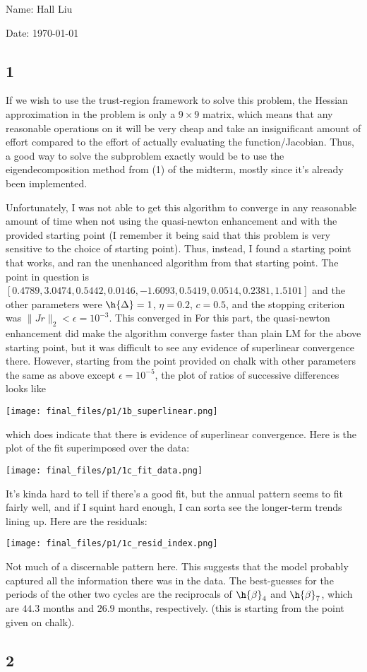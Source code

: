 \documentclass{article}
\newcommand{\ep}{\epsilon}
\begin{document}
Name: Hall Liu

Date: \today 
\vspace{1.5cm}
\subsection*{1}
If we wish to use the trust-region framework to solve this problem, the Hessian approximation in the problem is only a $9\times9$ matrix, which means that any reasonable operations on it will be very cheap and take an insignificant amount of effort compared to the effort of actually evaluating the function/Jacobian. Thus, a good way to solve the subproblem exactly would be to use the eigendecomposition method from (1) of the midterm, mostly since it's already been implemented. 

Unfortunately, I was not able to get this algorithm to converge in any reasonable amount of time when not using the quasi-newton enhancement and with the provided starting point (I remember it being said that this problem is very sensitive to the choice of starting point). Thus, instead, I found a starting point that works, and ran the unenhanced algorithm from that starting point. The point in question is 
$[0.4789,3.0474,0.5442,0.0146,-1.6093,0.5419,0.0514,0.2381,1.5101]$
and the other parameters were $\h{\Delta}=1$, $\eta=0.2$, $c=0.5$, and the stopping criterion was $\|Jr\|_2<\ep=10^{-3}$. This converged in 
For this part, the quasi-newton enhancement did make the algorithm converge faster than plain LM for the above starting point, but it was difficult to see any evidence of superlinear convergence there. However, starting from the point provided on chalk with other parameters the same as above except $\ep=10^{-5}$, the plot of ratios of successive differences looks like

\texttt{[image: final\_files/p1/1b\_superlinear.png]}

which does indicate that there is evidence of superlinear convergence.
Here is the plot of the fit superimposed over the data:

\texttt{[image: final\_files/p1/1c\_fit\_data.png]}

It's kinda hard to tell if there's a good fit, but the annual pattern seems to fit fairly well, and if I squint hard enough, I can sorta see the longer-term trends lining up. Here are the residuals:

\texttt{[image: final\_files/p1/1c\_resid\_index.png]}

Not much of a discernable pattern here. This suggests that the model probably captured all the information there was in the data. The best-guesses for the periods of the other two cycles are the reciprocals of $\h{\beta}_4$ and $\h{\beta}_7$, which are $44.3$ months and $26.9$ months, respectively. (this is starting from the point given on chalk).
\subsection*{2}
\end{document}

